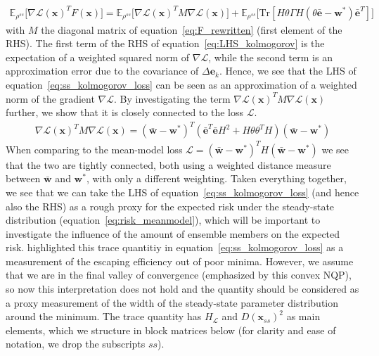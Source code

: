\documentclass{article} \usepackage{iclr2021_conference,times}
\def\eqref#1{equation~\ref{#1}}
\begin{document}
\begin{align} \label{eq:LHS_kolmogorov}
    \mathbb{E}_{\rho^{ss}} \big[\nabla \mathcal{L}(\mathbf{x})^T F(\mathbf{x})\big] = \mathbb{E}_{\rho^{ss}} \big[\nabla \mathcal{L}(\mathbf{x})^T M \nabla \mathcal{L}(\mathbf{x})\big] +  \mathbb{E}_{\rho^{ss}} \big[\text{Tr}[H\theta\Gamma H(\theta\bar{\mathbf{e}} - \mathbf{w}^*)\bar{\mathbf{e}}^T]\big]
\end{align}
with $M$ the diagonal matrix of \eqref{eq:F_rewritten} (first element of the RHS). The first term of the RHS of \eqref{eq:LHS_kolmogorov} is the expectation of a weighted squared norm of $\nabla \mathcal{L}$, while the second term is an approximation error due to the covariance of $\Delta \mathbf{e}_k$. Hence, we see that the LHS of \eqref{eq:ss_kolmogorov_loss} can be seen as an approximation of a weighted norm of the gradient $\nabla \mathcal{L}$. By investigating the term $\nabla \mathcal{L}(\mathbf{x})^T M \nabla \mathcal{L}(\mathbf{x})$ further, we show that it is closely connected to the loss $\mathcal{L}$.
\begin{align}
    \nabla \mathcal{L}(\mathbf{x})^T M \nabla \mathcal{L}(\mathbf{x}) =  (\bar{\mathbf{w}} - \mathbf{w}^*)^T(\bar{\mathbf{e}}^T\bar{\mathbf{e}}H^2 + H\theta \theta^T H)(\bar{\mathbf{w}} - \mathbf{w}^*)
\end{align}
When comparing to the mean-model loss $\mathcal{L} = (\bar{\mathbf{w}} - \mathbf{w}^*)^TH(\bar{\mathbf{w}} - \mathbf{w}^*)$ we see that the two are tightly connected, both using a weighted distance measure between $\bar{\mathbf{w}}$ and  $\mathbf{w}^*$, with only a different weighting. Taken everything together, we see that we can take the LHS of \eqref{eq:ss_kolmogorov_loss} (and hence also the RHS) as a rough proxy for the expected risk under the steady-state distribution (\eqref{eq:risk_meanmodel}), which will be important to investigate the influence of the amount of ensemble members on the expected risk. \citet{zhu_anisotropic_2018} highlighted this trace quantitiy in \eqref{eq:ss_kolmogorov_loss} as a measurement of the escaping efficiency out of poor minima. However, we assume that we are in the final valley of convergence (emphasized by this convex NQP), so now this interpretation does not hold and the quantity should be considered as a proxy measurement of the width of the steady-state parameter distribution around the minimum. The trace quantity has $H_{\mathcal{L}}$ and $D(\mathbf{x}_{ss})^2$ as main elements, which we structure in block matrices below (for clarity and ease of notation, we drop the subscripts $ss$).
\end{document}
